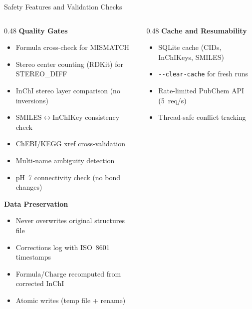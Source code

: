 \documentclass[aspectratio=169,11pt]{beamer}
\begin{document}
\begin{frame}{Safety Features and Validation Checks}
\small
\begin{columns}[T]
\begin{column}{0.48\textwidth}
\textbf{Quality Gates}\footnotesize
\begin{itemize}\setlength\itemsep{0pt}
  \item Formula cross-check for MISMATCH
  \item Stereo center counting (RDKit) for STEREO\_DIFF
  \item InChI stereo layer comparison (no inversions)
  \item SMILES$\leftrightarrow$InChIKey consistency check
  \item ChEBI/KEGG xref cross-validation
  \item Multi-name ambiguity detection
  \item pH~7 connectivity check (no bond changes)
\end{itemize}

\smallskip
\textbf{Data Preservation}\footnotesize
\begin{itemize}\setlength\itemsep{0pt}
  \item Never overwrites original structures file
  \item Corrections log with ISO~8601 timestamps
  \item Formula/Charge recomputed from corrected InChI
  \item Atomic writes (temp file + rename)
\end{itemize}
\end{column}

\begin{column}{0.48\textwidth}
\textbf{Cache and Resumability}\footnotesize
\begin{itemize}\setlength\itemsep{0pt}
  \item SQLite cache (CIDs, InChIKeys, SMILES)
  \item \texttt{-{}-clear-cache} for fresh runs
  \item Rate-limited PubChem API (5~req/s)
  \item Thread-safe conflict tracking
\end{itemize}


\end{column}
\end{columns}
\end{frame}
\end{document}
